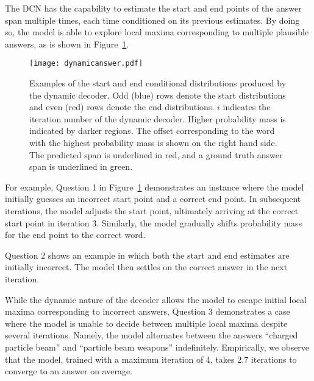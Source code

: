 \documentclass{article} \usepackage{iclr2017_conference,times}
\newcommand{\ours}{DCN\xspace}
\begin{document}
The \ours has the capability to estimate the start and end points of the answer span multiple times, each time conditioned on its previous estimates.
By doing so, the model is able to explore local maxima corresponding to multiple plausible answers, as is shown in Figure~\ref{fig:iterations}.

\begin{figure}[!th]
\centering
\texttt{[image: dynamicanswer.pdf]}
\vspace{-1cm}
\caption{Examples of the start and end conditional distributions produced by the dynamic decoder. Odd (blue) rows denote the start distributions and even (red) rows denote the end distributions. $i$ indicates the iteration number of the dynamic decoder. Higher probability mass is indicated by darker regions. The offset corresponding to the word with the highest probability mass is shown on the right hand side. The predicted span is underlined in red, and a ground truth answer span is underlined in green.}
\label{fig:iterations}
\end{figure}

For example, Question 1 in Figure~\ref{fig:iterations} demonstrates an instance where the model initially guesses an incorrect start point and a correct end point.
In subsequent iterations, the model adjusts the start point, ultimately arriving at the correct start point in iteration 3.
Similarly, the model gradually shifts probability mass for the end point to the correct word.

Question 2 shows an example in which both the start and end estimates are initially incorrect.
The model then settles on the correct answer in the next iteration.

While the dynamic nature of the decoder allows the model to escape initial local maxima corresponding to incorrect answers, Question 3 demonstrates a case where the model is unable to decide between multiple local maxima despite several iterations.
Namely, the model alternates between the answers ``charged particle beam'' and ``particle beam weapons'' indefinitely.
Empirically, we observe that the model, trained with a maximum iteration of 4, takes 2.7 iterations to converge to an answer on average.
\end{document}
